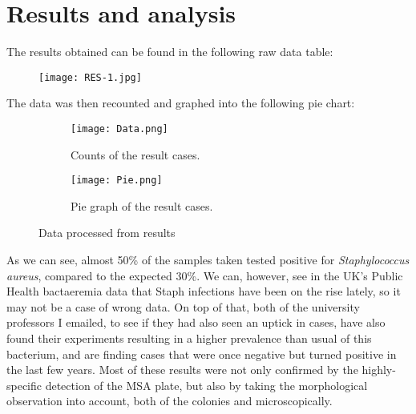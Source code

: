\section{Results and analysis}
The results obtained can be found in the following raw data table:
\begin{center}\begin{figure}[H]\centering\texttt{[image: RES-1.jpg]}\end{figure}\end{center}
The data was then recounted and graphed into the following pie chart:
\begin{center}\begin{figure}[H]\centering\begin{subfigure}[b]{0.4\linewidth}\texttt{[image: Data.png]}\caption{Counts of the result cases.}\end{subfigure}\begin{subfigure}[b]{0.38\linewidth}\texttt{[image: Pie.png]}\caption{Pie graph of the result cases.}\end{subfigure}\caption{Data processed from results}\end{figure}\end{center}\vspace{-1.5em}
As we can see, almost 50\% of the samples taken tested positive for \emph{Staphylococcus aureus}, compared to the expected 30\%\cite{StaphylococcusAureusHealthcare2020}. We can, however, see in the UK's Public Health bactaeremia data that Staph infections have been on the rise lately, so it may not be a case of wrong data\cite{englandMSSABacteraemiaAnnual2021}. On top of that, both of the university professors I emailed, to see if they had also seen an uptick in cases, have also found their experiments resulting in a higher prevalence than usual of this bacterium, and are finding cases that were once negative but turned positive in the last few years. Most of these results were not only confirmed by the highly-specific detection of the MSA plate, but also by taking the morphological observation into account, both of the colonies and microscopically.

